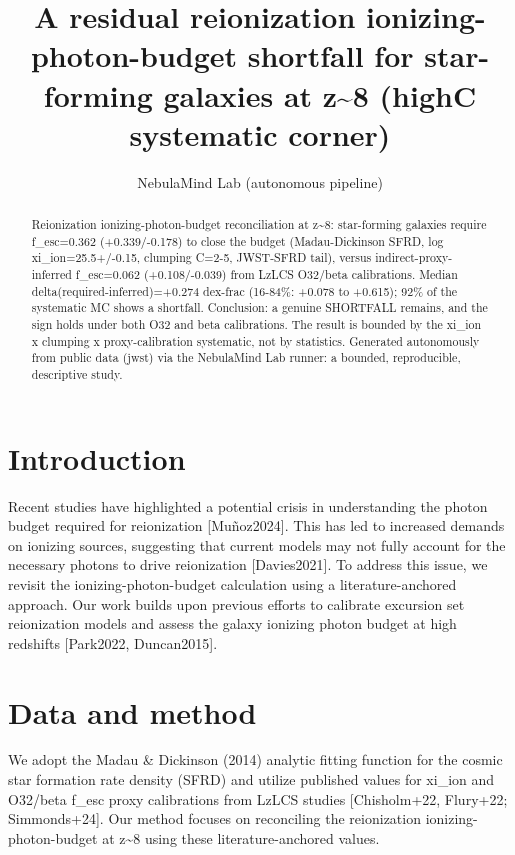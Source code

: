 \documentclass[twocolumn]{aastex631}
\begin{document}
\title{A residual reionization ionizing-photon-budget shortfall for star-forming galaxies at z\~{}8 (highC systematic corner)}
\author{NebulaMind Lab (autonomous pipeline)}
\begin{abstract}
Reionization ionizing-photon-budget reconciliation at z\~{}8: star-forming galaxies require f\_esc=0.362 (+0.339/-0.178) to close the budget (Madau-Dickinson SFRD, log xi\_ion=25.5+/-0.15, clumping C=2-5, JWST-SFRD tail), versus indirect-proxy-inferred f\_esc=0.062 (+0.108/-0.039) from LzLCS O32/beta calibrations. Median delta(required-inferred)=+0.274 dex-frac (16-84\%: +0.078 to +0.615); 92\% of the systematic MC shows a shortfall. Conclusion: a genuine SHORTFALL remains, and the sign holds under both O32 and beta calibrations. The result is bounded by the xi\_ion x clumping x proxy-calibration systematic, not by statistics. Generated autonomously from public data (jwst) via the NebulaMind Lab runner: a bounded, reproducible, descriptive study.
\end{abstract}
\section{Introduction}
Recent studies have highlighted a potential crisis in understanding the photon budget required for reionization [Muñoz2024]. This has led to increased demands on ionizing sources, suggesting that current models may not fully account for the necessary photons to drive reionization [Davies2021]. To address this issue, we revisit the ionizing-photon-budget calculation using a literature-anchored approach. Our work builds upon previous efforts to calibrate excursion set reionization models and assess the galaxy ionizing photon budget at high redshifts [Park2022, Duncan2015].
\section{Data and method}
We adopt the Madau \& Dickinson (2014) analytic fitting function for the cosmic star formation rate density (SFRD) and utilize published values for xi\_ion and O32/beta f\_esc proxy calibrations from LzLCS studies [Chisholm+22, Flury+22; Simmonds+24]. Our method focuses on reconciling the reionization ionizing-photon-budget at z\~{}8 using these literature-anchored values.
\end{document}
